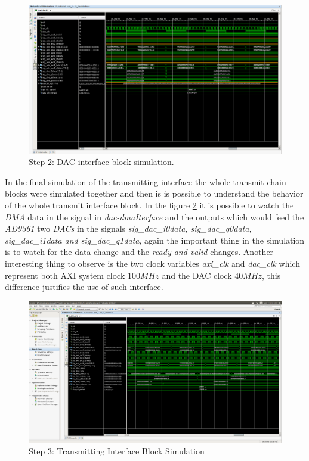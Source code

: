 \begin{figure}[htbp]
    \centering
    \includegraphics[height=.4\textwidth, width=1\textwidth,
    trim={{.13\textwidth} {.8\textwidth} {.05\textwidth} {.15\textwidth}},
    clip]{./figures/dacInterface}
    \caption{ Step 2: DAC interface block simulation.
    \label{fig:simdac}}
\end{figure}

In the final simulation of the transmitting interface the whole transmit chain
blocks were simulated together and then is is possible to understand the
behavior of the whole transmit interface block. In the figure \ref{fig:simtxif}
it is possible to watch the \textit{DMA} data in the signal in
\textit{dac-dmaIterface} and the outputs which would feed the \textit{AD9361}
two \textit{DACs} in the signals \textit{sig\_dac\_i0data, sig\_dac\_q0data,
sig\_dac\_i1data and sig\_dac\_q1data}, again the important thing in the simulation
is to watch for the data change and the  \textit{ready and valid} changes.
Another interesting thing to observe is the two clock variables \textit{axi\_clk}
and \textit{dac\_clk} which represent both AXI system clock $ 100 MHz$ and the
DAC clock $40 MHz$, this difference justifies the use of such interface.


\begin{figure}[htbp]
    \centering
    \includegraphics[width=1\textwidth,
    trim={{.67\textwidth} {.7\textwidth} {.05\textwidth} {.3\textwidth}},
    clip]{./figures/txInterface}
    \caption{ Step 3: Transmitting Interface Block Simulation
    \label{fig:simtxif}}
\end{figure}

